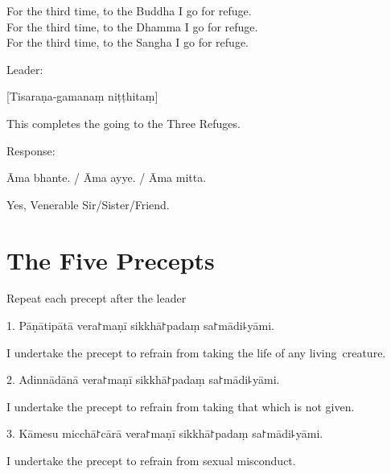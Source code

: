 \begin{english}
  For the third time, to the Buddha I go for refuge.\\
  For the third time, to the Dhamma I go for refuge.\\
  For the third time, to the Sangha I go for refuge.
\end{english}

\begin{instruction}
  Leader:
\end{instruction}

[Tisaraṇa-gamanaṃ niṭṭhitaṃ]

\begin{english}
  This completes the going to the Three Refuges.
\end{english}

\begin{instruction}
  Response:
\end{instruction}

Āma bhante. / Āma ayye. / Āma mitta.

\begin{english}
  Yes, Venerable Sir/Sister/Friend.
\end{english}

\chapter{The Five Precepts}%

\begin{instruction}
  Repeat each precept after the leader
\end{instruction}

1. Pāṇātipātā vera꜓maṇī sikkhā꜓padaṃ sa꜓mādi꜕yāmi.

\begin{english}
  I undertake the precept to refrain from taking the life of any living~creature.
\end{english}

2. Adinnādānā vera꜓maṇī sikkhā꜓padaṃ sa꜓mādi꜕yāmi.

\begin{english}
  I undertake the precept to refrain from taking that which is not given.
\end{english}

3. Kāmesu micchā꜓cārā vera꜓maṇī sikkhā꜓padaṃ sa꜓mādi꜕yāmi.

\begin{english}
  I undertake the precept to refrain from sexual misconduct.
\end{english}

